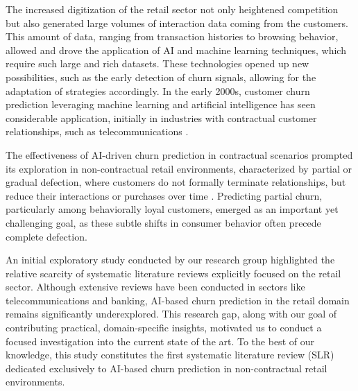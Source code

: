 \documentclass[preprint,12pt]{elsarticle}
\begin{document}

The increased digitization of the retail sector not only heightened competition but also generated large volumes of interaction data coming from the customers. This amount of data, ranging from transaction histories to browsing behavior, allowed and drove the application of AI and machine learning techniques, which require such large and rich datasets. These technologies opened up new possibilities, such as the early detection of churn signals, allowing for the adaptation of strategies accordingly. 
In the early 2000s, customer churn prediction leveraging machine learning and artificial intelligence has seen considerable application, initially in industries with contractual customer relationships, such as telecommunications \cite{Predicting-subscriber-dissatisfaction-Mozer}. 

The effectiveness of AI-driven churn prediction in contractual scenarios prompted its exploration in non-contractual retail environments, characterized by partial or gradual defection, where customers do not formally terminate relationships, but reduce their interactions or purchases over time \cite{S37-ID826-Buckinx}. 
Predicting partial churn, particularly among behaviorally loyal customers, emerged as an important yet challenging goal, as these subtle shifts in consumer behavior often precede complete defection.


An initial exploratory study conducted by our research group highlighted the relative scarcity of systematic literature reviews explicitly focused on the retail sector. Although extensive reviews have been conducted in sectors like telecommunications and banking, AI-based churn prediction in the retail domain remains significantly underexplored. This research gap, along with our goal of contributing practical, domain-specific insights, motivated us to conduct a focused investigation into the current state of the art. To the best of our knowledge, this study constitutes the first systematic literature review (SLR) dedicated exclusively to AI-based churn prediction in non-contractual retail environments.
\end{document}
